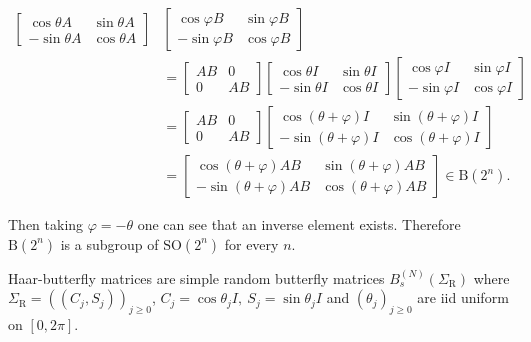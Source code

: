 \begin{align}
\begin{bmatrix} \cos \theta A & \sin \theta A \\ - \sin \theta A & \cos \theta A \end{bmatrix}&\begin{bmatrix} \cos \varphi B & \sin \varphi B \\ - \sin \varphi B & \cos \varphi B \end{bmatrix} \\
&= \begin{bmatrix} AB & 0 \\ 0 & AB \end{bmatrix} \begin{bmatrix}\cos \theta I & \sin \theta I \\ - \sin \theta I & \cos \theta I \end{bmatrix}\begin{bmatrix} \cos \varphi I & \sin \varphi I \\ - \sin \varphi I & \cos \varphi I \end{bmatrix}\\
& = \begin{bmatrix} AB & 0 \\ 0 & AB \end{bmatrix} \begin{bmatrix}\cos (\theta + \varphi) I & \sin (\theta+ \varphi) I \\ - \sin (\theta + \varphi) I & \cos (\theta + \varphi) I \end{bmatrix}\\
& = \begin{bmatrix}\cos (\theta + \varphi) AB & \sin (\theta+ \varphi) AB \\ - \sin (\theta + \varphi) AB & \cos (\theta + \varphi) AB \end{bmatrix} \in \mathrm B(2^n).
\end{align}

Then taking $\varphi = - \theta$ one can see that an inverse element exists. Therefore $\mathrm B(2^n)$ is a subgroup of $\mathrm{SO}(2^n)$ for every $n$.

\begin{definition}
Haar-butterfly matrices are simple random butterfly matrices $B_s^{(N)}(\Sigma_{\mathrm{R}})$ where $\Sigma_{\mathrm{R}} = ( (C_j,S_j) )_{j\geq 0}$, $C_j = \cos \theta_j I, ~ S_j = \sin \theta_j I$ and $(\theta_j)_{j \geq 0}$ are iid uniform on $[0, 2\pi]$.  
\end{definition}

